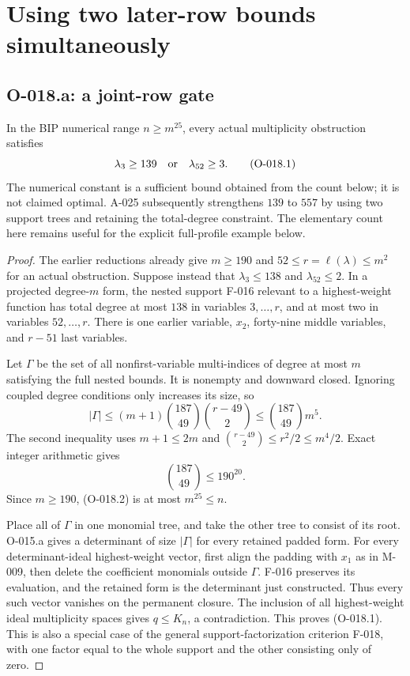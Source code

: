 \section{Using two later-row bounds simultaneously}

\subsection{O-018.a: a joint-row gate}
In the BIP numerical range $n\geq m^{25}$, every actual
multiplicity obstruction satisfies
\[
                         \lambda_3\geq139
                           \quad\hbox{or}\quad\lambda_{52}\geq3.
                                                               \tag{O-018.1}
\]
The numerical constant is a sufficient bound obtained from
the count below; it is not claimed optimal.
A-025 subsequently strengthens $139$ to $557$ by using
two support trees and retaining the total-degree constraint.
The elementary count here remains useful for the explicit
full-profile example below.

\begin{proof}
The earlier reductions already give $m\geq190$ and
$52\leq r=\ell(\lambda)\leq m^2$ for an actual obstruction.
Suppose instead that $\lambda_3\leq138$ and
$\lambda_{52}\leq2$. In a projected degree-$m$ form,
the nested support F-016 relevant to a highest-weight
function has total degree at most $138$ in variables
$3,\ldots,r$, and at most two in variables $52,\ldots,r$.
There is one earlier variable, $x_2$, forty-nine middle
variables, and $r-51$ last variables.

Let $\Gamma$ be the set of all nonfirst-variable multi-indices
of degree at most $m$ satisfying the full nested bounds.
It is nonempty and downward closed. Ignoring coupled degree
conditions only increases its size, so
\[
 |\Gamma|\leq(m+1)\binom{187}{49}\binom{r-49}{2}
                           \leq\binom{187}{49}m^5.     \tag{O-018.2}
\]
The second inequality uses $m+1\leq2m$ and
$\binom{r-49}{2}\leq r^2/2\leq m^4/2$.
Exact integer arithmetic gives
\[
                         \binom{187}{49}\leq190^{20}.
\]
Since $m\geq190$, (O-018.2) is at most $m^{25}\leq n$.

Place all of $\Gamma$ in one monomial tree, and take the
other tree to consist of its root. O-015.a gives a determinant
of size $|\Gamma|$ for every retained padded form.
For every determinant-ideal highest-weight vector, first align
the padding with $x_1$ as in M-009, then delete the coefficient
monomials outside $\Gamma$. F-016 preserves its evaluation,
and the retained form is the determinant just constructed.
Thus every such vector vanishes on the permanent closure.
The inclusion of all highest-weight ideal multiplicity spaces
gives $q\leq K_n$, a contradiction. This proves (O-018.1).
This is also a special case of the general support-factorization
criterion F-018, with one factor equal to the whole support
and the other consisting only of zero.
\end{proof}

